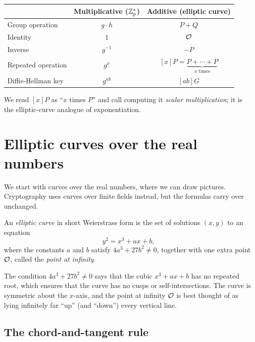 \begin{center}
\begin{tabular}{lcc}
\hline
                    & Multiplicative ($\mathbb{Z}^*_p$) & Additive (elliptic curve) \\
\hline
Group operation     & $g \cdot h$       & $P + Q$ \\
Identity            & $1$               & $\mathcal{O}$ \\
Inverse             & $g^{-1}$          & $-P$ \\
Repeated operation  & $g^x$             & $[x]P = \underbrace{P + \cdots + P}_{x \text{ times}}$ \\
Diffie-Hellman key  & $g^{ab}$          & $[ab]G$ \\
\hline
\end{tabular}
\end{center}

We read $[x]P$ as ``$x$ times $P$'' and call computing it
\emph{scalar multiplication}; it is the elliptic-curve analogue of
exponentiation.

\section{Elliptic curves over the real numbers}

We start with curves over the real numbers, where we can draw pictures.
Cryptography uses curves over finite fields instead, but the formulas
carry over unchanged.

\begin{definition}
An \emph{elliptic curve} in short Weierstrass form is the set of
solutions $(x, y)$ to an equation
\[ y^2 = x^3 + ax + b, \]
where the constants $a$ and $b$ satisfy $4a^3 + 27b^2 \neq 0$,
together with one extra point $\mathcal{O}$, called the \emph{point at infinity}.
\end{definition}

The condition $4a^3 + 27b^2 \neq 0$ says that the cubic $x^3 + ax + b$
has no repeated root, which ensures that the curve has no cusps or
self-intersections.
The curve is symmetric about the $x$-axis, and the point at infinity
$\mathcal{O}$ is best thought of as lying infinitely far ``up'' (and ``down'')
every vertical line.

\subsection{The chord-and-tangent rule}

